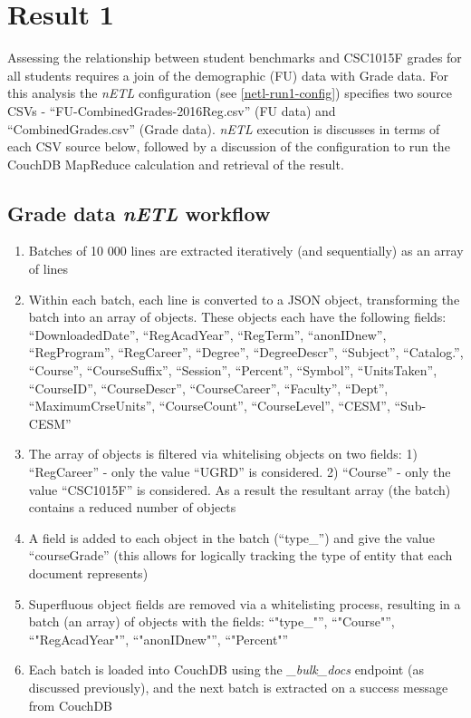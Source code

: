 \section{Result 1}
Assessing the relationship between student benchmarks and CSC1015F grades for all students requires a join of the demographic (FU) data with Grade data. For this analysis the \textit{nETL} configuration (see \ref{netl-run1-config}) specifies two source CSVs - ``FU-CombinedGrades-2016Reg.csv'' (FU data) and ``CombinedGrades.csv'' (Grade data). \textit{nETL} execution is discusses in terms of each CSV source below, followed by a discussion of the configuration to run the CouchDB MapReduce calculation and retrieval of the result.

\subsection*{Grade data \textit{nETL} workflow}
\begin{enumerate}
    \item Batches of 10 000 lines are extracted iteratively (and sequentially) as an array of lines
    \item Within each batch, each line is converted to a JSON object, transforming the batch into an array of objects. These objects each have the following fields: ``DownloadedDate'', ``RegAcadYear'', ``RegTerm'', ``anonIDnew'', ``RegProgram'', ``RegCareer'', ``Degree'', ``DegreeDescr'', ``Subject'', ``Catalog.'', ``Course'', ``CourseSuffix'', ``Session'', ``Percent'', ``Symbol'', ``UnitsTaken'', ``CourseID'', ``CourseDescr'', ``CourseCareer'', ``Faculty'', ``Dept'', ``MaximumCrseUnits'', ``CourseCount'', ``CourseLevel'', ``CESM'', ``Sub-CESM''
    \item The array of objects is filtered via whitelising objects on two fields: 1) ``RegCareer'' - only the value ``UGRD'' is considered. 2) ``Course'' - only the value ``CSC1015F'' is considered. As a result the resultant array (the batch) contains a reduced number of objects
    \item A field is added to each object in the batch (``type_'') and give the value ``courseGrade'' (this allows for logically tracking the type of entity that each document represents)
    \item Superfluous object fields are removed via a whitelisting process, resulting in a batch (an array) of objects with the fields: ``"type_"'', ``"Course"'', ``"RegAcadYear"'', ``"anonIDnew"'', ``"Percent"''
    \item Each batch is loaded into CouchDB using the \textit{\_bulk\_docs} endpoint (as discussed previously), and the next batch is extracted on a success message from CouchDB
\end{enumerate}

